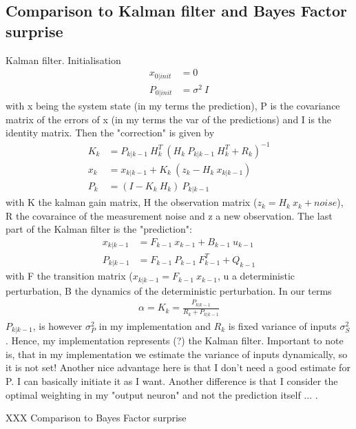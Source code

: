 \documentclass[10pt,a4paper,draft]{article}
\begin{document}
\subsection*{Comparison to Kalman filter and Bayes Factor surprise}
%
Kalman filter. Initialisation
%
\begin{align*}
x_{0|init} &= 0 \\
P_{0|init} &= \sigma^2\ I
\end{align*}
%
with x being the system state (in my terms the prediction), P is the covariance matrix of the errors of x (in my terms the var of the predictions) and I is the identity matrix.
%
Then the "correction" is given by
%
\begin{align*}
K_k &= P_{k|k-1}\ H_k^T\ \left( H_k\ P_{k|k-1}\ H_k^T + R_k \right)^{-1} \\
x_k &= x_{k|k-1} + K_k\ \left( z_k - H_k\ x_{k|k-1}\right) \\
P_k &= \left( I - K_k\ H_k\right)\ P_{k|k-1}
\end{align*}
%
with K the kalman gain matrix, H the observation matrix ($z_k = H_k\ x_k + noise$), R the covaraince of the measurement noise and z a new observation. The last part of the Kalman filter is the "prediction":
%
\begin{align*}
x_{k|k-1} &= F_{k-1}\ x_{k-1} + B_{k-1}\ u_{k-1} \\
P_{k|k-1} &= F_{k-1}\ P_{k-1}\ F_{k-1}^T + Q_{k-1}
\end{align*}
%
with F the transition matrix ($x_{k|k-1} = F_{k-1}\ x_{k-1}$, u a deterministic perturbation, B the dynamics of the deterministic perturbation. In our terms
%
\begin{align*}
\alpha = K_k = \frac{P_{k|k-1}}{R_k + P_{k|k-1}}
\end{align*}
%
$P_{k|k-1}$, is however $\sigma_P^2$ in my implementation and $R_k$ is fixed variance of inputs $\sigma_S^2$. Hence, my implementation represents (?) the Kalman filter. Important to note is, that in my implementation we estimate the variance of inputs dynamically, so it is not set! Another nice advantage here is that I don't need a good estimate for P. I can basically initiate it as I want. Another difference is that I consider the optimal weighting in my "output neuron" and not the prediction itself ... .

XXX Comparison to Bayes Factor surprise
\end{document}

